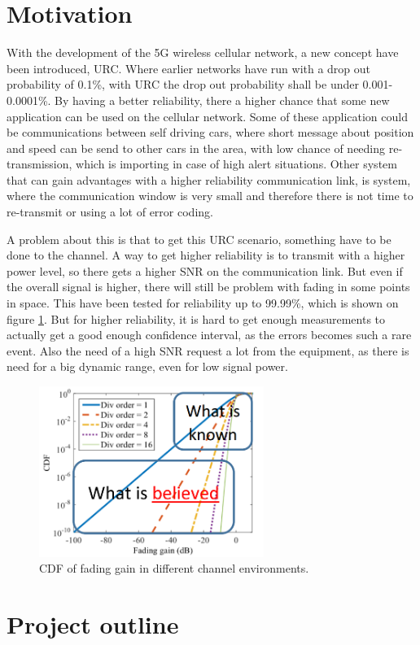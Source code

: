 \section{Motivation}
With the development of the 5G wireless cellular network, a new concept have been introduced, \gls{URC}. Where earlier networks have run with a drop out probability of 0.1\%, with URC the drop out probability shall be under 0.001-0.0001\%. By having a better reliability, there a higher chance that some new application can be used on the cellular network. 
Some of these application could be communications between self driving cars, where short message about position and speed can be send to other cars in the area, with low chance of needing re-transmission, which is importing in case of high alert situations. Other system that can gain advantages with a higher reliability communication link, is system, where the communication window is very small and therefore there is not time to re-transmit or using a lot of error coding.


A problem about this is that to get this URC scenario, something have to be done to the channel. A way to get higher reliability is to transmit with a higher power level, so there gets a higher \gls{SNR} on the communication link. But even if the overall signal is higher, there will still be problem with fading in some points in space. This have been tested for reliability up to 99.99\%, which is shown on figure \ref{fading_gain}. But for higher reliability, it is hard to get enough measurements to actually get a good enough confidence interval, as the errors becomes such a rare event. Also the need of a high SNR request a lot from the equipment, as there is need for a big dynamic range, even for low signal power.


\begin{figure}[H]
\centering
\includegraphics[width=0.65\textwidth]{figures/fading_gain.png}
\caption{\gls{CDF} of fading gain in different channel environments.}
\label{fading_gain}
\end{figure}


\section{Project outline}





